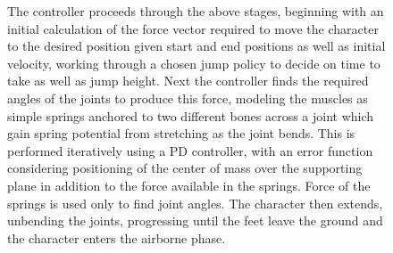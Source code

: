 \documentclass[landscape,26pt]{sciposter}
\begin{document}
\begin{minipage}[t]{17in}
\begin{figure}
            \caption{The controller proceeds through the above stages, beginning with an initial calculation of the force vector required to move the character to the desired position given start and end positions as well as initial velocity, working through a chosen jump policy to decide on time to take as well as jump height.  Next the controller finds the required angles of the joints to produce this force, modeling the muscles as simple springs anchored to two different bones across a joint which gain spring potential from stretching as the joint bends.  This is performed iteratively using a PD controller, with an error function considering positioning of the center of mass over the supporting plane in addition to the force available in the springs.  Force of the springs is used only to find joint angles.  The character then extends, unbending the joints, progressing until the feet leave the ground and the character enters the airborne phase.}
        \end{figure}

\end{minipage}
%
\hfill
\end{document}

